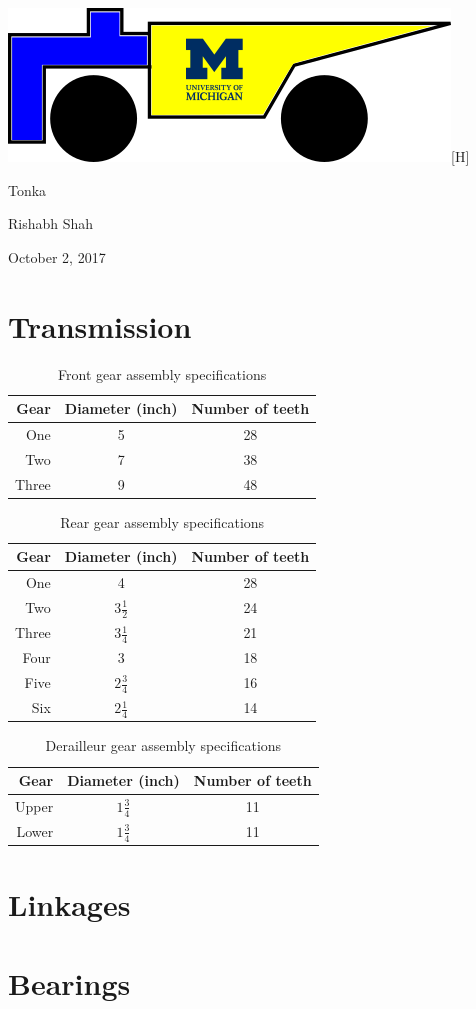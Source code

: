 \documentclass[11pt]{article}
\begin{document}
{\large\noindent \includegraphics{Logo}[H]

\noindent Tonka

\noindent Rishabh Shah

\noindent October 2, 2017}

\section*{Transmission}
\begin{table}[H]
	\centering
	\begin{tabular}{|r|c|c|}
		\hline
		\textbf{Gear} & \textbf{Diameter (inch)} & \textbf{Number of teeth} \\
		\hline
		One & 5 & 28 \\
		\hline
		Two & 7 & 38 \\
		\hline
		Three & 9 & 48 \\
		\hline
	\end{tabular}
	\caption{Front gear assembly specifications}
\end{table}
\begin{table}[H]
	\centering
	\begin{tabular}{|r|c|c|}
		\hline
		\textbf{Gear} & \textbf{Diameter (inch)} & \textbf{Number of teeth} \\
		\hline
		One & 4 & 28 \\
		\hline
		Two & \(3\frac{1}{2}\) & 24 \\
		\hline
		Three & \(3\frac{1}{4}\) & 21 \\
		\hline
		Four & 3 & 18 \\
		\hline
		Five & \(2\frac{3}{4}\) & 16 \\
		\hline
		Six & \(2\frac{1}{4}\) & 14 \\
		\hline
	\end{tabular}
	\caption{Rear gear assembly specifications}
\end{table}
\begin{table}[H]
	\centering
	\begin{tabular}{|r|c|c|}
		\hline
		\textbf{Gear} & \textbf{Diameter (inch)} & \textbf{Number of teeth} \\
		\hline
		Upper & \(1\frac{3}{4}\) & 11 \\
		\hline
		Lower & \(1\frac{3}{4}\) & 11 \\
		\hline
	\end{tabular}
	\caption{Derailleur gear assembly specifications}
\end{table}

\section*{Linkages}

\section*{Bearings}
\end{document}
